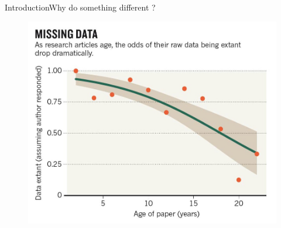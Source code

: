\documentclass{eecslides}
\begin{document}


\begin{frame}{Introduction}{Why do something different ?}

\begin{figure}
\includegraphics[width=0.65\paperwidth]{Nature_fig.jpg}
\end{figure}

\end{frame}





%	
%		
\end{document}
